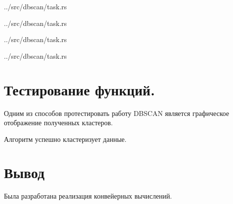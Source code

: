 \begin{lstinputlisting}[
	caption={Структура задачи, часть 1},
	label={lst:task1},
	style={rust},
    linerange={16-40}
]{../src/dbscan/task.rs}
\end{lstinputlisting}
\clearpage
\begin{lstinputlisting}[
	caption={Структура задачи, часть 2},
	label={lst:task2},
	style={rust},
    linerange={42-75}
]{../src/dbscan/task.rs}
\end{lstinputlisting}
\clearpage
\begin{lstinputlisting}[
	caption={Структура задачи, часть 3},
	label={lst:task3},
	style={rust},
    linerange={77-108}
]{../src/dbscan/task.rs}
\end{lstinputlisting}
\clearpage
\begin{lstinputlisting}[
	caption={Структура задачи, часть 4},
	label={lst:task4},
	style={rust},
    linerange={110-155}
]{../src/dbscan/task.rs}
\end{lstinputlisting}


\section{Тестирование функций.}

Одним из способов протестировать работу DBSCAN является графическое отображение полученных кластеров. 

Алгоритм успешно кластеризует данные.

\section*{Вывод}

Была разработана реализация конвейерных вычислений.
